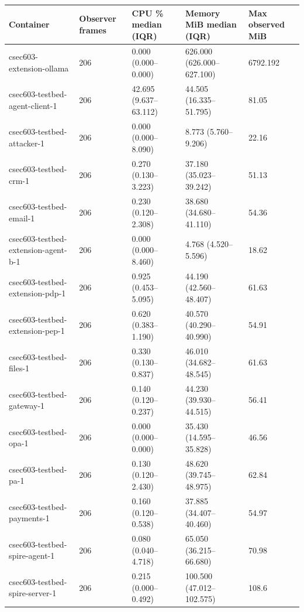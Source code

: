 \begin{tabular}{lllll}
\hline
Container & Observer frames & CPU \% median (IQR) & Memory MiB median (IQR) & Max observed MiB \\
\hline
csec603-extension-ollama & 206 & 0.000 (0.000--0.000) & 626.000 (626.000--627.100) & 6792.192 \\
csec603-testbed-agent-client-1 & 206 & 42.695 (9.637--63.112) & 44.505 (16.335--51.795) & 81.05 \\
csec603-testbed-attacker-1 & 206 & 0.000 (0.000--8.090) & 8.773 (5.760--9.206) & 22.16 \\
csec603-testbed-crm-1 & 206 & 0.270 (0.130--3.223) & 37.180 (35.023--39.242) & 51.13 \\
csec603-testbed-email-1 & 206 & 0.230 (0.120--2.308) & 38.680 (34.680--41.110) & 54.36 \\
csec603-testbed-extension-agent-b-1 & 206 & 0.000 (0.000--8.460) & 4.768 (4.520--5.596) & 18.62 \\
csec603-testbed-extension-pdp-1 & 206 & 0.925 (0.453--5.095) & 44.190 (42.560--48.407) & 61.63 \\
csec603-testbed-extension-pep-1 & 206 & 0.620 (0.383--1.190) & 40.570 (40.290--40.990) & 54.91 \\
csec603-testbed-files-1 & 206 & 0.330 (0.130--0.837) & 46.010 (34.682--48.545) & 61.63 \\
csec603-testbed-gateway-1 & 206 & 0.140 (0.120--0.237) & 44.230 (39.930--44.515) & 56.41 \\
csec603-testbed-opa-1 & 206 & 0.000 (0.000--0.000) & 35.430 (14.595--35.828) & 46.56 \\
csec603-testbed-pa-1 & 206 & 0.130 (0.120--2.430) & 48.620 (39.745--48.975) & 62.84 \\
csec603-testbed-payments-1 & 206 & 0.160 (0.120--0.538) & 37.885 (34.407--40.460) & 54.97 \\
csec603-testbed-spire-agent-1 & 206 & 0.080 (0.040--4.718) & 65.050 (36.215--66.680) & 70.98 \\
csec603-testbed-spire-server-1 & 206 & 0.215 (0.000--0.492) & 100.500 (47.012--102.575) & 108.6 \\
\hline
\end{tabular}
